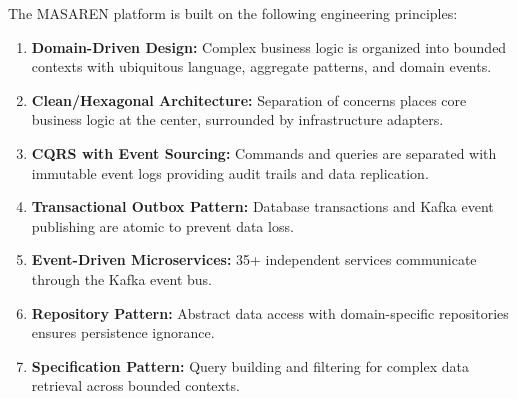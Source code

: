 \documentclass[11pt,a4paper]{article}
\begin{document}
The MASAREN platform is built on the following engineering principles:

\begin{enumerate}
  \item \textbf{Domain-Driven Design:} Complex business logic is organized into bounded contexts with ubiquitous language, aggregate patterns, and domain events.
  \item \textbf{Clean/Hexagonal Architecture:} Separation of concerns places core business logic at the center, surrounded by infrastructure adapters.
  \item \textbf{CQRS with Event Sourcing:} Commands and queries are separated with immutable event logs providing audit trails and data replication.
  \item \textbf{Transactional Outbox Pattern:} Database transactions and Kafka event publishing are atomic to prevent data loss.
  \item \textbf{Event-Driven Microservices:} 35+ independent services communicate through the Kafka event bus.
  \item \textbf{Repository Pattern:} Abstract data access with domain-specific repositories ensures persistence ignorance.
  \item \textbf{Specification Pattern:} Query building and filtering for complex data retrieval across bounded contexts.
\end{enumerate}

\clearpage
\end{document}
